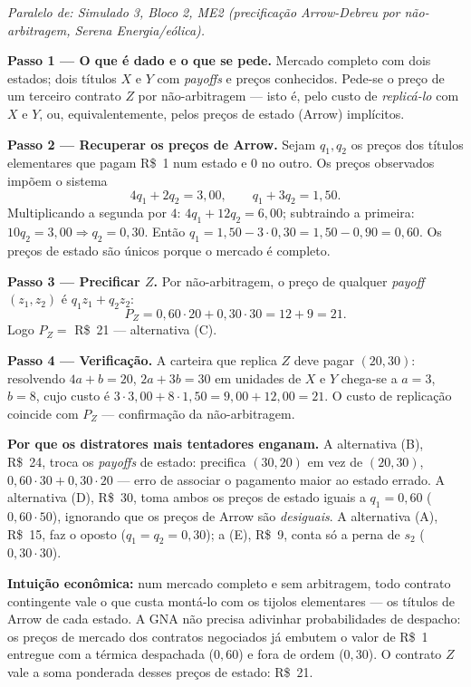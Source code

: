 \begin{solucao}
{\footnotesize\textit{Paralelo de: Simulado 3, Bloco 2, ME2 (precificação Arrow-Debreu por não-arbitragem, Serena Energia/eólica).}}\par\vspace{0.2em}
\textbf{Passo 1 --- O que é dado e o que se pede.} Mercado completo com dois estados; dois títulos $X$ e $Y$ com \emph{payoffs} e preços conhecidos. Pede-se o preço de um terceiro contrato $Z$ por não-arbitragem --- isto é, pelo custo de \emph{replicá-lo} com $X$ e $Y$, ou, equivalentemente, pelos preços de estado (Arrow) implícitos.

\textbf{Passo 2 --- Recuperar os preços de Arrow.} Sejam $q_1,q_2$ os preços dos títulos elementares que pagam R\$~1 num estado e $0$ no outro. Os preços observados impõem o sistema
\[ 4q_1+2q_2=3{,}00, \qquad q_1+3q_2=1{,}50. \]
Multiplicando a segunda por $4$: $4q_1+12q_2=6{,}00$; subtraindo a primeira: $10q_2=3{,}00\Rightarrow q_2=0{,}30$. Então $q_1=1{,}50-3\cdot 0{,}30=1{,}50-0{,}90=0{,}60$. Os preços de estado são únicos porque o mercado é completo.

\textbf{Passo 3 --- Precificar $Z$.} Por não-arbitragem, o preço de qualquer \emph{payoff} $(z_1,z_2)$ é $q_1 z_1+q_2 z_2$:
\[ P_Z=0{,}60\cdot 20+0{,}30\cdot 30=12+9=21. \]
Logo $P_Z=$ R\$~21 --- alternativa (C).

\textbf{Passo 4 --- Verificação.} A carteira que replica $Z$ deve pagar $(20,30)$: resolvendo $4a+b=20$, $2a+3b=30$ em unidades de $X$ e $Y$ chega-se a $a=3$, $b=8$, cujo custo é $3\cdot 3{,}00+8\cdot 1{,}50=9{,}00+12{,}00=21$. O custo de replicação coincide com $P_Z$ --- confirmação da não-arbitragem.

\textbf{Por que os distratores mais tentadores enganam.} A alternativa (B), R\$~24, troca os \emph{payoffs} de estado: precifica $(30,20)$ em vez de $(20,30)$, $0{,}60\cdot 30+0{,}30\cdot 20$ --- erro de associar o pagamento maior ao estado errado. A alternativa (D), R\$~30, toma ambos os preços de estado iguais a $q_1=0{,}60$ ($0{,}60\cdot 50$), ignorando que os preços de Arrow são \emph{desiguais}. A alternativa (A), R\$~15, faz o oposto ($q_1=q_2=0{,}30$); a (E), R\$~9, conta só a perna de $s_2$ ($0{,}30\cdot 30$).

\textbf{Intuição econômica:} num mercado completo e sem arbitragem, todo contrato contingente vale o que custa montá-lo com os tijolos elementares --- os títulos de Arrow de cada estado. A GNA não precisa adivinhar probabilidades de despacho: os preços de mercado dos contratos negociados já embutem o valor de R\$~1 entregue com a térmica despachada ($0{,}60$) e fora de ordem ($0{,}30$). O contrato $Z$ vale a soma ponderada desses preços de estado: R\$~21.
\end{solucao}


